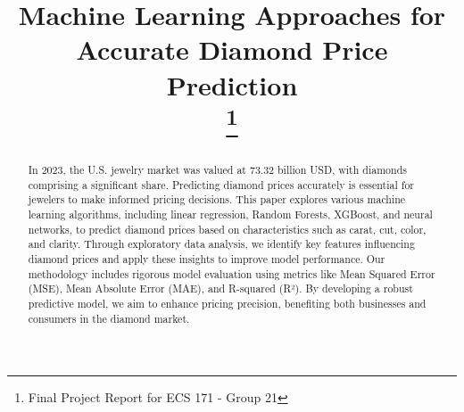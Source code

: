 \documentclass[conference]{IEEEtran}
\begin{document}
\title{Machine Learning Approaches for Accurate Diamond Price Prediction\\
\thanks{Final Project Report for ECS 171 - Group 21}
}

\author{
\and
{}
\and
{}
\and
{}
\and
{}
}

\maketitle

\begin{abstract}
In 2023, the U.S. jewelry market was valued at 73.32 billion USD, with diamonds comprising a significant share. Predicting diamond prices accurately is essential for jewelers to make informed pricing decisions. This paper explores various machine learning algorithms, including linear regression, Random Forests, XGBoost, and neural networks, to predict diamond prices based on characteristics such as carat, cut, color, and clarity. Through exploratory data analysis, we identify key features influencing diamond prices and apply these insights to improve model performance. Our methodology includes rigorous model evaluation using metrics like Mean Squared Error (MSE), Mean Absolute Error (MAE), and R-squared (R²). By developing a robust predictive model, we aim to enhance pricing precision, benefiting both businesses and consumers in the diamond market.
\end{abstract}
\end{document}
